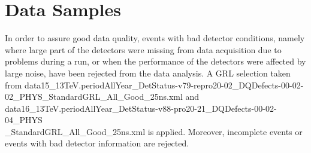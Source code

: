 \chapter{Data Samples}

In order to assure good data quality, events with bad detector
  conditions, namely where large part of the detectors were missing
  from data acquisition due to problems during a run, or when the
  performance of the detectors were affected by large noise, have been
  rejected from the data analysis. A GRL selection taken from
  data15\_13TeV.periodAllYear\_DetStatus-v79-repro20-02\_DQDefects-00-02-02\_PHYS\_StandardGRL\_All\_Good\_25ns.xml
  and \newline data16\_13TeV.periodAllYear\_DetStatus-v88-pro20-21\_DQDefects-00-02-04\_PHYS \\ \_StandardGRL\_All\_Good\_25ns.xml
  is applied. Moreover, incomplete events or events with bad detector information are rejected. 